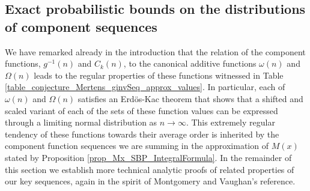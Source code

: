 \documentclass[11pt,reqno,a4letter]{article}
\numberwithin{figure}{section}
\numberwithin{table}{section}
\theoremstyle{plain}
\numberwithin{theorem}{section}
\theoremstyle{definition}
\begin{document}
\subsection{Exact probabilistic bounds on the distributions of component sequences} 

We have remarked already in the introduction that the relation of the component 
functions, $g^{-1}(n)$ and $C_k(n)$, to the canonical additive functions 
$\omega(n)$ and $\Omega(n)$ leads to the regular properties of these functions 
witnessed in Table \ref{table_conjecture_Mertens_ginvSeq_approx_values}. 
In particular, each of $\omega(n)$ and $\Omega(n)$ satisfies 
an Erd\"os-Kac theorem that shows that a shifted and scaled variant of each 
of the sets of these function values can be expressed through a 
limiting normal distribution as $n \rightarrow \infty$. This extremely regular 
tendency of these functions towards their average order is inherited by the component 
function sequences we are summing in the approximation of $M(x)$ stated by 
Proposition \ref{prop_Mx_SBP_IntegralFormula}. 
In the remainder of this section we establish more technical analytic proofs of 
related properties of our key sequences, again in the spirit of 
Montgomery and Vaughan's reference. 
\end{document}
